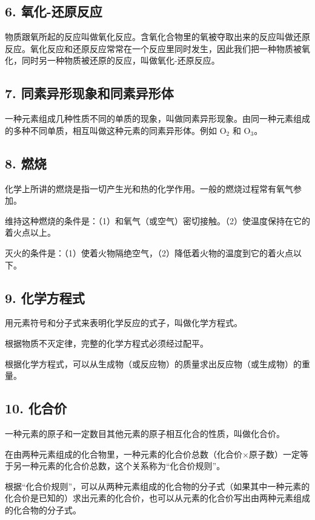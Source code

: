 \subsection{6. 氧化-还原反应}

物质跟氧所起的反应叫做氧化反应。含氧化合物里的氧被夺取出来的反应叫做还原反应。氧化反应和还原反应常常在一个反应里同时发生，因此我们把一种物质被氧化，同时另一种物质被还原的反应，叫做氧化-还原反应。

\subsection{7. 同素异形现象和同素异形体}

一种元素组成几种性质不同的单质的现象，叫做同素异形现象。由同一种元素组成的多种不同单质，相互叫做这种元素的同素异形体。例如
\(\mathrm{O}_{2}\) 和 \(\mathrm{O}_{3}\)。

\subsection{8. 燃烧}

化学上所讲的燃烧是指一切产生光和热的化学作用。一般的燃烧过程常有氧气参加。

维持这种燃烧的条件是：（1）和氧气（或空气）密切接触。（2）使温度保持在它的着火点以上。

灭火的条件是：（1）使着火物隔绝空气，（2）降低着火物的温度到它的着火点以下。

\subsection{9. 化学方程式}

用元素符号和分子式来表明化学反应的式子，叫做化学方程式。

根据物质不灭定律，完整的化学方程式必须经过配平。

根据化学方程式，可以从生成物（或反应物）的质量求出反应物（或生成物）的重量。

\subsection{10. 化合价}

一种元素的原子和一定数目其他元素的原子相互化合的性质，叫做化合价。

在由两种元素组成的化合物里，一种元素的化合价总数（化合价×原子数）一定等于另一种元素的化合价总数，这个关系称为``化合价规则''。

根据``化合价规则''，可以从两种元素组成的化合物的分子式（如果其中一种元素的化合价是已知的）求出元素的化合价，也可以从元素的化合价写出由两种元素组成的化合物的分子式。

